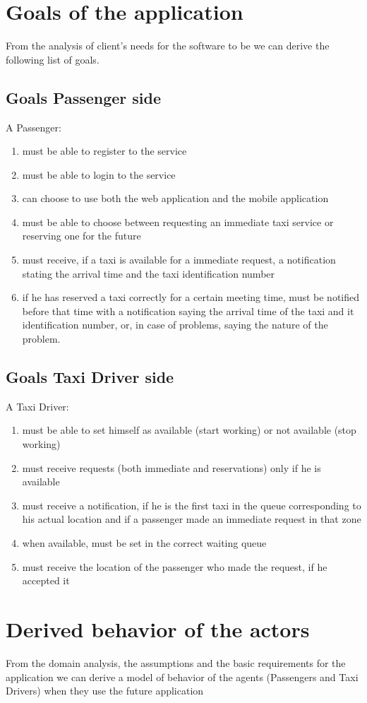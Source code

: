 \section{Goals of the application}
From the analysis of client's needs for the software to be we can derive the following list of goals.
\subsection{Goals Passenger side}
A Passenger:
\begin{enumerate}
\item must be able to register to the service
\item must be able to login to the service
\item can choose to use both the web application and the mobile application
\item  must be able to choose between requesting an immediate taxi service or reserving one for the future
\item must receive, if a taxi is available for a immediate request, a notification stating the arrival time and the taxi identification number
\item if he has reserved a taxi correctly for a certain meeting time, must be notified before that time with a notification saying the arrival time of the taxi and it identification number, or, in case of problems, saying the nature of the problem.
\end{enumerate}
\subsection{Goals Taxi Driver side}
A Taxi Driver:
\begin{enumerate}
\item must be able to set himself as available (start working) or not available (stop working)
\item must receive requests (both immediate and reservations) only if he is available 
\item must receive a notification, if he is the first taxi in the queue corresponding to his actual location and if a passenger made an immediate request in that zone
\item when available, must be set in the correct waiting queue
\item must receive the location of the passenger who made the request, if he accepted it
\end{enumerate}

\section{Derived behavior of the actors}
From the domain analysis, the assumptions and the basic requirements for the application we can derive a model of behavior of the agents (Passengers and Taxi Drivers) when they use the future application
